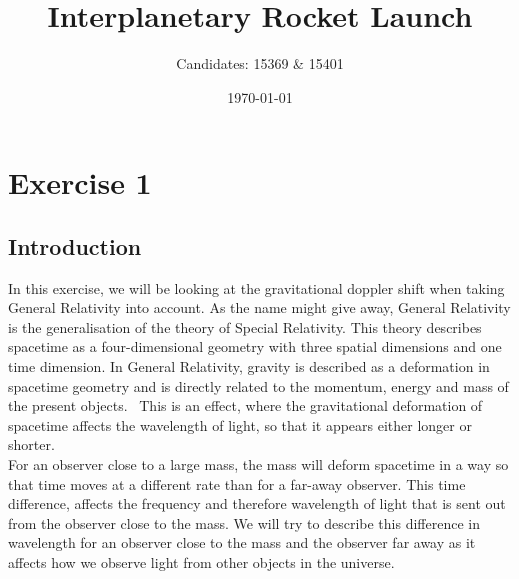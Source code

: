 \documentclass[reprint,english,notitlepage]{revtex4-2}
\begin{document}
\title{Interplanetary Rocket Launch}
\author{Candidates: 15369 \& 15401}
\date{\today}

\maketitle

\section{Exercise 1}\label{sec:exercise-1}
    \subsection{Introduction}\label{subsec:introduction1}
        In this exercise, we will be looking at the gravitational doppler shift when taking General Relativity into account.
        As the name might give away, General Relativity is the generalisation of the theory of Special Relativity.
        This theory describes spacetime as a four-dimensional geometry with three spatial dimensions and one time dimension.
        In General Relativity, gravity is described as a deformation in spacetime geometry and is directly related to the momentum, energy and mass of the present objects.~\parencite[][]{wiki_gr}
        This is an effect, where the gravitational deformation of spacetime affects the wavelength of light, so that it appears either longer or shorter.\\
        For an observer close to a large mass, the mass will deform spacetime in a way so that time moves at a different rate than for a far-away observer.
        This time difference, affects the frequency and therefore wavelength of light that is sent out from the observer close to the mass.
        We will try to describe this difference in wavelength for an observer close to the mass and the observer far away as it affects how we observe light from other objects in the universe.
\end{document}
